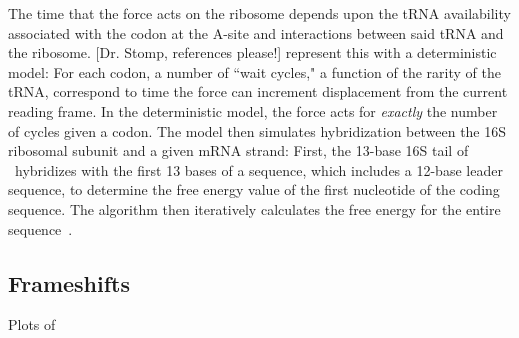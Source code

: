 \documentclass[12pt]{article}
\begin{document}
The time that the force acts on the ribosome depends upon
the tRNA availability associated with the codon at the A-site 
and interactions between said tRNA and the ribosome. [Dr. Stomp, references please!]
\citeauthor{lalit:mechanics} represent this with a deterministic model: For each codon,
a number of ``wait cycles," a function of the rarity of the
tRNA, correspond to time the force can
increment displacement from the current reading frame.  In the
deterministic model, the force acts for \emph{exactly} the number
of cycles given a codon. The model then
simulates hybridization between the
16S ribosomal subunit and a given mRNA strand: First, the 13-base 16S
tail of \ecoli\ hybridizes with the first 13 bases of a sequence,
which includes a 12-base leader sequence, to determine the free energy 
value of the first nucleotide of the coding sequence. The algorithm then iteratively calculates
the free energy for the entire sequence~\cite{starmer}.

\subsection{Frameshifts}
\label{section:frameshifts}

\begin{cfigure}
  \caption{Plots of~\prfB}
  \label{prfB:detplots}
\end{cfigure}
\end{document}
